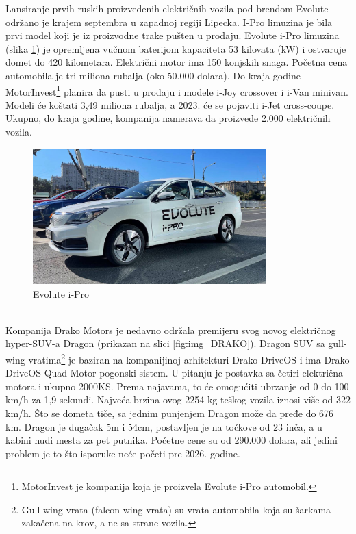 \documentclass[a4paper]{article}
\begin{document}
    Lansiranje prvih ruskih proizvedenih električnih vozila pod brendom Evolute održano je krajem septembra u zapadnoj regiji Lipecka. I-Pro limuzina je bila prvi model koji je iz proizvodne trake pušten u prodaju. Evolute i-Pro limuzina (slika \ref{fig:IMG_EVOLUTE}) je opremljena vučnom baterijom kapaciteta 53 kilovata (kW) i ostvaruje domet do 420 kilometara. Električni motor ima 150 konjskih snaga. Početna cena automobila je tri miliona rubalja (oko 50.000 dolara). Do kraja godine MotorInvest\footnote{MotorInvest je kompanija koja je proizvela Evolute i-Pro automobil.} planira da pusti u prodaju i modele i-Joy crossover i i-Van minivan. Modeli će koštati 3,49 miliona rubalja, a 2023. će se pojaviti i-Jet cross-coupe. Ukupno, do kraja godine, kompanija namerava da proizvede 2.000 električnih vozila.\\ 
    

    
    \begin{figure}[h]
        \centering
        \includegraphics[width=90mm,scale=0.5]{evoluteipro.jpg}
        \caption{Evolute i-Pro}
        \label{fig:IMG_EVOLUTE}
        \end{figure}

\\

    Kompanija Drako Motors je nedavno održala premijeru svog novog električnog hyper-SUV-a Dragon (prikazan na slici \ref{fig:img_DRAKO}). 
    Dragon SUV sa gull-wing vratima\footnote{Gull-wing vrata (falcon-wing vrata) su vrata automobila koja su šarkama zakačena na krov, a ne sa strane vozila.} je baziran na kompanijinoj arhitekturi Drako DriveOS i ima Drako DriveOS Quad Motor pogonski sistem. U pitanju je postavka sa četiri električna motora i ukupno 2000KS. Prema najavama, to će omogućiti ubrzanje od 0 do 100 km/h za 1,9 sekundi.
    Najveća brzina ovog 2254 kg teškog vozila iznosi više od 322 km/h. Što se dometa tiče, sa jednim punjenjem Dragon može da pređe do 676 km. Dragon je dugačak 5m i 54cm, postavljen je na točkove od 23 inča, a u kabini nudi mesta za pet putnika. Početne cene su od 290.000 dolara, ali jedini problem je to što isporuke neće početi pre 2026. godine.
 
\end{document}
